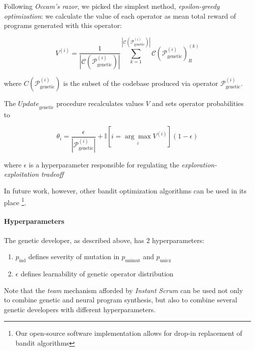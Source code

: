 Following \emph{Occam's razor}, we picked the simplest method, \emph{epsilon-greedy optimization}: we calculate the value of each operator as mean total reward of programs generated with this operator:

\begin{equation}
    V^{(i)} = \frac{1}{|\mathcal{C}(\mathcal{P}_\text{genetic}^{(i)})|} 
    \sum\limits_{k=1}^{|\mathcal{C}(\mathcal{P}_\text{genetic}^{(i)})|}
    \mathcal{C}(\mathcal{P}_\text{genetic}^{(i)})_R^{(k)} 
\end{equation}

where $C(\mathcal{P}_\text{genetic}^{(i)})$ is the subset of the codebase produced via operator $\mathcal{P}_\text{genetic}^{(i)}$.

The $\mathit{Update}_\text{genetic}$ procedure recalculates values $V$ and sets operator probabilities to

\begin{equation}
    \theta_i = \frac{\epsilon}{|\mathcal{P}_\text{genetic}^{(i)}|} +
    \mathbb{I}[i = \underset{i}{\arg\max} V^{(i)}] (1 - \epsilon)
\end{equation}

where $\epsilon$ is a hyperparameter responsible for regulating the \emph{exploration-exploitation tradeoff} \cite{banditsexplo}

In future work, however, other bandit optimization algorithms can be used in its place \footnote{Our open-source software implementation allows for drop-in replacement of bandit algorithms}.

\paragraph{Hyperparameters}
\label{sec:genhyper}

The genetic developer, as described above, has 2 hyperparameters:

\begin{enumerate}
    \item $p_\text{ind}$ defines severity of mutation in $p_\text{unimut}$ and $p_\text{unicx}$
    \item $\epsilon$ defines learnability of genetic operator distribution
\end{enumerate}

Note that the \emph{team} mechanism afforded by \emph{Instant Scrum} can be used not only to combine genetic and neural program synthesis, but also to combine several genetic developers with different hyperparameters.

